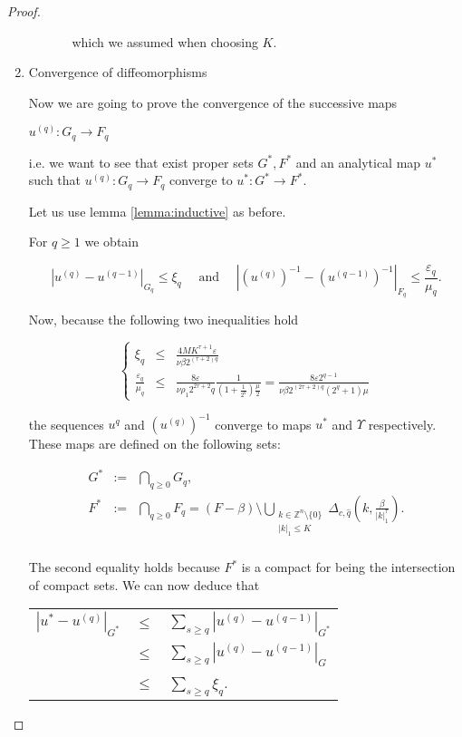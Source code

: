 \begin{proof}
\begin{enumerate}
\begin{itemize}
\begin{itemize}
which we assumed when choosing $K$.


\end{itemize}

 \end{itemize}

\item Convergence of diffeomorphisms

Now we are going to prove the convergence of the successive maps

$u^{(q)}: G_q \rightarrow F_q$

i.e. we want to see that exist proper sets $G^*, F^*$ and an analytical map $u^*$ such that $u^{(q)}:G_q \rightarrow F_q$ converge to $u^*: G^* \rightarrow F^*$.

Let us use lemma \ref{lemma:inductive} as before.

For $q \geq 1$ we obtain

$$|u^{(q)} - u^{(q-1)}|_{G_q} \leq \xi_q \quad \text{ and } \quad |(u^{(q)})^{-1} -(u^{(q-1)})^{-1}|_{F_q}\leq \frac{\varepsilon_q}{\mu_q}.$$


Now, because the following two inequalities hold

$$
\left\{
\begin{array}{rcl}
\xi_q & \leq & \frac{4M K^{\tau+1}\varepsilon}{\nu \beta 2^{(\tau+2)q}}\\
\frac{\varepsilon_q}{\mu_q} & \leq & \frac{8\varepsilon}{\nu \rho_1 2^{2\tau+2}q} \frac{1}{(1+\frac{1}{2^q})\frac{\mu}{2}} = \frac{8\varepsilon 2^{q-1}}{\nu \beta 2^{(2\tau+2)q}(2^q+1)\mu}
\end{array}
\right.
$$

the sequences $u^{q}$ and $(u^{(q)})^{-1}$ converge to maps $u^*$ and $\Upsilon$ respectively.
These maps are defined on the following sets:

$$
\begin{array}{rcl}
G^* & := & \bigcap_{q\geq 0} G_q,\\
F^* & := & \bigcap_{q\geq 0} F_q = (F - \beta)\setminus \bigcup_{\substack{k\in\mathbb{Z}^n\setminus\{0\} \\ |k|_1 \leq K}}\Delta_{c,\hat q}(k,\frac{\beta}{|k|_1^\tau}).\\

\end{array}
$$

The second equality holds because $F^*$ is a compact for being the intersection of compact sets. We can now deduce that


\begin{longtable}{rcl}
$|u^* - u^{(q)}|_{G^*}$ & $\leq$ & $\sum_{s\geq q} |u^{(q)} - u^{(q-1)}|_{G^*}$ \\
& $\leq$ & $\sum_{s\geq q} |u^{(q)} - u^{(q-1)}|_{G}$ \\
& $\leq$ & $\sum_{s\geq q} \xi_q$. \\


\end{longtable}
\end{enumerate}
\end{proof}
